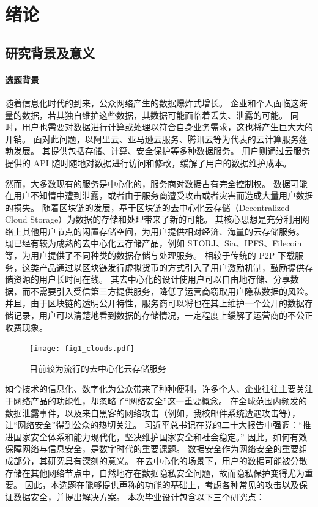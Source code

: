 \chapter{绪论}

\section{研究背景及意义}

\subsubsection{选题背景}

随着信息化时代的到来，公众网络产生的数据爆炸式增长。
%
企业和个人面临这海量的数据，若其独自维护这些数据，其数据可能面临着丢失、泄露的可能。
%
同时，用户也需要对数据进行计算或处理以符合自身业务需求，这也将产生巨大大的开销。
%
面对此问题，以阿里云、亚马逊云服务、腾讯云等为代表的云计算服务蓬勃发展。
%
其提供包括存储、计算、安全保护等多种数据服务。
%
用户则通过云服务提供的 API 随时随地对数据进行访问和修改，缓解了用户的数据维护成本。


然而，大多数现有的服务是中心化的，服务商对数据占有完全控制权。
%
数据可能在用户不知情中遭到泄露，或者由于服务商遭受攻击或者灾害而造成大量用户数据的损失。
%
随着区块链的发展，基于区块链的去中心化云存储（Decentralized Cloud Storage）为数据的存储和处理带来了新的可能。
%
其核心思想是充分利用网络上其他用户节点的闲置存储空间，为用户提供相对经济、海量的云存储服务。
%
现已经有较为成熟的去中心化云存储产品，例如 STORJ、Sia、IPFS、Filecoin 等，为用户提供了不同种类的数据存储与处理服务。
%
相较于传统的 P2P 下载服务，这类产品通过以区块链发行虚拟货币的方式引入了用户激励机制，鼓励提供存储资源的用户长时间在线。
%
其去中心化的设计使用户可以自由地存储、分享数据，而不需要引入受信第三方提供服务，降低了运营商窃取用户隐私数据的风险。
%
并且，由于区块链的透明公开特性，服务商可以将也在其上维护一个公开的数据存储记录，用户可以清楚地看到数据的存储情况，一定程度上缓解了运营商的不公正收费现象。

\begin{figure}[b]
\centering
\texttt{[image: fig1\_clouds.pdf]}
\caption{目前较为流行的去中心化云存储服务}
\label{fig-clouds}
\end{figure}

如今技术的信息化、数字化为公众带来了种种便利，许多个人、企业往往主要关注于网络产品的功能性，却忽略了“网络安全”这一重要概念。
%
在全球范围内频发的数据泄露事件，以及来自黑客的网络攻击（例如，我校邮件系统遭遇攻击等），让“网络安全”得到公众的热切关注。
%
习近平总书记在党的二十大报告中强调：“推进国家安全体系和能力现代化，坚决维护国家安全和社会稳定。”
%
因此，如何有效保障网络与信息安全，是数字时代的重要课题。
%
数据安全作为网络安全的重要组成部分，其研究具有深刻的意义。
%
在去中心化的场景下，用户的数据可能被分散存储在其他网络节点中，自然地存在数据隐私安全问题，故而隐私保护变得尤为重要。
%
因此，本选题在能够提供声称的功能的基础上，考虑各种常见的攻击以及保证数据安全，并提出解决方案。
%
本次毕业设计包含以下三个研究点：

